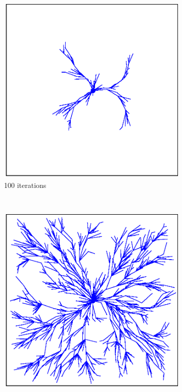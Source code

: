 \documentclass{ctuthesis}
\begin{document}
\begin{figure}[!ht]
  \centering
  \begin{subfigure}[b]{0.3\textwidth}
      \includegraphics[width=\textwidth]{figChap3/RRTstar_expansion100.eps}
      \caption{100 iterations}
  \end{subfigure}
  ~ %
  \begin{subfigure}[b]{0.3\textwidth}
      \includegraphics[width=\textwidth]{figChap3/RRTstar_expansion1000.eps}

\end{subfigure}
\end{figure}
\end{document}
